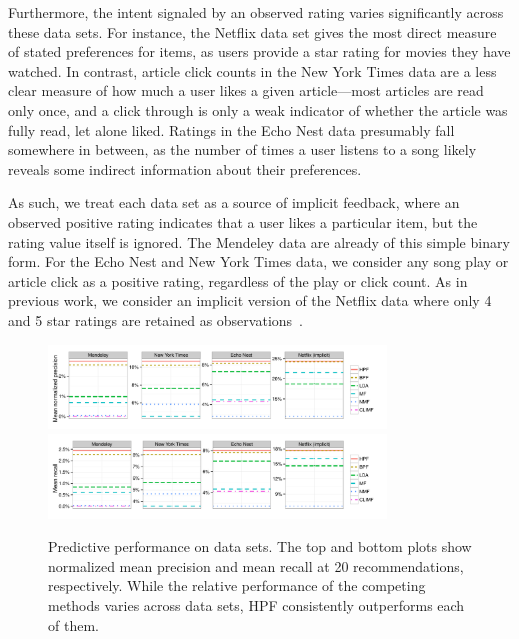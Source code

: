 Furthermore, the intent signaled by an observed rating varies
significantly across these data sets. For instance, the Netflix data
set gives the most direct measure of stated preferences for items, as
users provide a star rating for movies they have watched. In
contrast, article click counts in the New York Times data are a less
clear measure of how much a user likes a given article---most articles
are read only once, and a click through is only a weak indicator of
whether the article was fully read, let alone liked. Ratings in the
Echo Nest data presumably fall somewhere in between, as the number of
times a user listens to a song likely reveals some indirect
information about their preferences.

As such, we treat each data set as a source of implicit feedback,
where an observed positive rating indicates that a user likes a
particular item, but the rating value itself is ignored. The Mendeley
data are already of this simple binary form. For the Echo Nest and New
York Times data, we consider any song play or article click as a
positive rating, regardless of the play or click count. As in previous
work, we consider an implicit version of the Netflix data where only 4
and 5 star ratings are retained as
observations~\cite{Paquet:2013p9197}.

\begin{figure}[t!]
\centering
\includegraphics[width=0.8\textwidth]{newfigs/mean_precision_at_20.pdf}\\
\includegraphics[width=0.8\textwidth]{newfigs/mean_recall_at_20.pdf}\\
\caption{Predictive performance on data sets. The top and bottom plots
  show normalized mean precision and mean recall at 20
  recommendations, respectively. While the relative performance of
  the competing methods varies across data sets, HPF consistently outperforms
  each of them.
}
\label{fig:precision_recall}
\end{figure}


